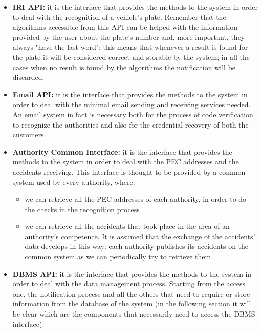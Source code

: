 \begin{itemize}
			\item \textbf{IRI API:} it is the interface that provides the methods to the system in order to deal with the recognition of a vehicle's plate. Remember that the algorithms accessible from this API can be helped with the information provided by the user about the plate's number and, more important, they always "have the last word": this means that whenever a result is found for the plate it will be considered correct and storable by the system; in all the cases when no result is found by the algorithms the notification will be discarded.
			
			\item \textbf{Email API:} it is the interface that provides the methods to the system in order to deal with the minimal email sending and receiving services needed. An email system in fact is necessary both for the process of code verification to recognize the authorities and also for the credential recovery of both the customers.
			
			\item \textbf{Authority Common Interface:} it is the interface that provides the methods to the system in order to deal with the PEC addresses and the accidents receiving. This interface is thought to be provided by a common system used by every authority, where:
			
			\begin{itemize}
				\item we can retrieve all the PEC addresses of each authority, in order to do the checks in the recognition process
				\item we can retrieve all the accidents that took place in the area of an authority's competence. It is assumed that the exchange of the accidents' data develops in this way: each authority publishes its accidents on the common system as we can periodically try to retrieve them.
			\end{itemize}
		
			\item \textbf{DBMS API:} it is the interface that provides the methods to the system in order to deal with the data management process. Starting from the access one, the notification process and all the others that need to require or store information from the database of the system (in the following section it will be clear which are the components that necessarily need to access the DBMS interface).
			 
		\end{itemize}
	
